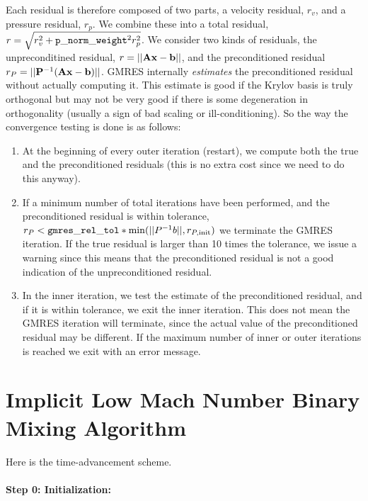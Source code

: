 \documentclass[final]{siamltex}
\def\Ab {{\bf A}}
\def\bb {{\bf b}}
\def\Pb {{\bf P}}
\def\xb {{\bf x}}
\begin{document}
Each residual is therefore composed of two parts, a velocity residual, $r_v$,
and a pressure residual, $r_p$.  We combine these into a total residual, 
$r=\sqrt{r_v^2 + {\tt p\_norm\_weight}^2 r_p^2}$.  We consider two
kinds of residuals, the unpreconditined residual, $r=||\Ab\xb-\bb||$, 
and the preconditioned 
residual $r_P=||\Pb^{-1}(\Ab\xb-\bb)||$.  GMRES internally {\it estimates} the 
preconditioned residual without actually computing it. This estimate 
is good if the Krylov basis is truly orthogonal but may not be very good 
if there is some degeneration in orthogonality (usually a sign of bad 
scaling or ill-conditioning). So the way the convergence testing is done 
is as follows:\\
\begin{enumerate}
\item At the beginning of every outer iteration (restart), we compute 
both the true and the preconditioned residuals (this is no extra cost 
since we need to do this anyway).\\
\item If a minimum number of total iterations have been performed, and the 
preconditioned residual is within tolerance,
$r_P < {\tt gmres\_rel\_tol}*\min(||P^{-1}b||,r_{P,\rm init})$
we terminate the GMRES iteration. If the true residual is larger than 10 
times the tolerance, we issue a warning since this means that the 
preconditioned residual is not a good indication of the 
unpreconditioned residual.\\
\item In the inner iteration, we  test the estimate of the preconditioned
residual, and if it is within tolerance, we exit the inner iteration.
This does not mean the GMRES iteration will terminate, since the actual
value of the preconditioned residual may be different.
If the maximum number of inner or outer iterations is reached we exit 
with an error message.
\end{enumerate}

\section{Implicit Low Mach Number Binary Mixing Algorithm}
Here is the time-advancement scheme.\\ \\
{\bf Step 0: Initialization:}\\
\end{document}
